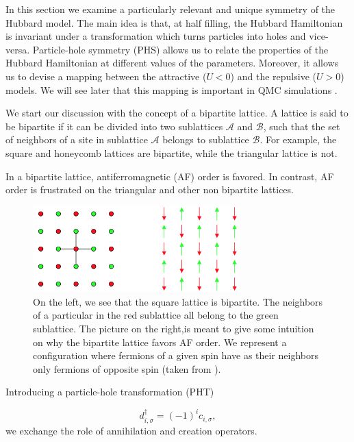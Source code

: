 In this section we examine a particularly relevant and unique symmetry of the Hubbard model. The main idea is that, at half filling, the Hubbard Hamiltonian is invariant under a transformation which turns particles into holes and vice-versa. Particle-hole symmetry (PHS) allows us to relate the properties of the Hubbard Hamiltonian at different values of the parameters. Moreover, it allows us to devise a mapping between the attractive ($U < 0$) and the repulsive ($U > 0$) models. We will see later that this mapping is important in QMC simulations \cite{Pavarini2016}.

We start our discussion with the concept of a bipartite lattice. A lattice is said to be bipartite if it can be divided into two sublattices $\mathcal{A}$ and $\mathcal{B}$, such that the set of neighbors of a site in sublattice $\mathcal{A}$ belongs to sublattice $\mathcal{B}$. For example, the square and honeycomb lattices are bipartite, while the triangular lattice is not.

In a bipartite lattice, antiferromagnetic (AF) order is favored. In contrast, AF order is frustrated on the triangular and other non bipartite lattices.

\begin{figure}[H]\label{fig:bipartite}
\centering
\includegraphics[width = 8cm]{Figures/HubbardModel/bipartite}
\caption[Bipartite lattices and antiferromagnetic order.]{On the left, we see that the square lattice is bipartite. The neighbors of a particular in the red sublattice all belong to the green sublattice. The picture on the right,is meant to give some intuition on why the bipartite lattice favors AF order. We represent a configuration where fermions of a given spin have as their neighbors only fermions of opposite spin (taken from \cite{Pavarini2016}). }
\end{figure}

Introducing a particle-hole transformation (PHT)

\begin{equation}\label{eq:PHT}
d_{ i, \sigma}^\dagger = (-1)^i c_{i, \sigma} ,
\end{equation}
we exchange the role of annihilation and creation operators.


